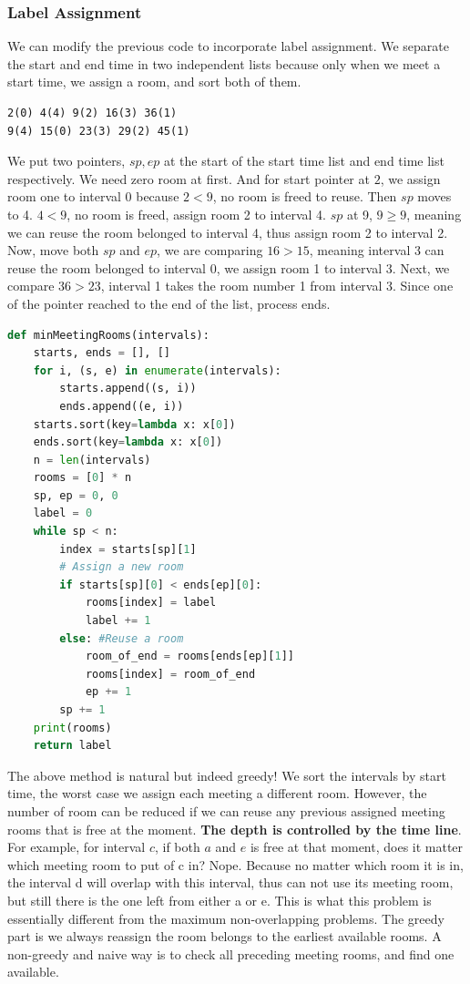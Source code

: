 \documentclass[../main.tex]{subfiles}
\begin{document}
\subsubsection{Label Assignment}
We can modify the previous code to incorporate label assignment.  We separate the start and end time in two independent lists because only when we meet a start time, we assign a room, and sort both of them. 
\begin{lstlisting}[numbers=none]
2(0) 4(4) 9(2) 16(3) 36(1)
9(4) 15(0) 23(3) 29(2) 45(1)
\end{lstlisting}
We put two pointers, $sp, ep$ at the start of the start time list and end time list respectively. We need zero room at first. And for start pointer at $2$, we assign room one to interval 0 because $2<9$, no room is freed to reuse. Then $sp$ moves to 4. $4<9$, no room is freed, assign room 2 to interval 4. $sp$ at 9, $9\geq9$, meaning we can reuse the room belonged to interval 4, thus assign room 2 to interval 2. Now, move both $sp$ and $ep$, we are comparing $16>15$, meaning interval 3 can reuse the room belonged to interval 0, we assign room 1 to interval 3. Next, we compare $36 > 23$, interval 1 takes the room number 1 from interval 3. Since one of the pointer reached to the end of the list, process ends.  
\begin{lstlisting}[language=Python]
def minMeetingRooms(intervals):
    starts, ends = [], []
    for i, (s, e) in enumerate(intervals):
        starts.append((s, i))
        ends.append((e, i))
    starts.sort(key=lambda x: x[0])
    ends.sort(key=lambda x: x[0])
    n = len(intervals)
    rooms = [0] * n
    sp, ep = 0, 0
    label = 0
    while sp < n:
        index = starts[sp][1]
        # Assign a new room
        if starts[sp][0] < ends[ep][0]:
            rooms[index] = label
            label += 1
        else: #Reuse a room
            room_of_end = rooms[ends[ep][1]]
            rooms[index] = room_of_end
            ep += 1
        sp += 1
    print(rooms)
    return label
\end{lstlisting}

The above method is natural but indeed greedy! We sort the intervals by start time, the worst case we assign each meeting a different room. However, the number of room can be reduced if we can reuse any previous assigned meeting rooms that is free at the moment.  \textbf{The depth is controlled by the time line}.  For example, for interval $c$, if both $a$ and $e$ is free at that moment, does it matter which meeting room to put of c in? Nope. Because no matter which room it is in, the interval d will overlap with this interval, thus can not use its meeting room, but still there is the one left from either a or e. This is what this problem is essentially different from the maximum non-overlapping problems. The greedy part is we always reassign the room belongs to the earliest available rooms. A non-greedy and naive way is to check all preceding meeting rooms, and find one available. 
\end{document}

